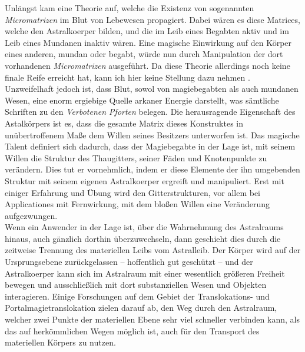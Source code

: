 \documentclass[a5paper,8pt]{book}
\begin{document}
\begin{multicols}{2}
Unlängst kam eine Theorie auf, welche die Existenz von sogenannten \textit{Micromatrizen} im Blut von Lebewesen
propagiert. Dabei wären es diese Matrices, welche den Astralkoerper bilden, und die im Leib eines Begabten aktiv und im
Leib eines Mundanen inaktiv wären. Eine magische Einwirkung auf den Körper eines anderen, mundan oder begabt, würde nun
durch Manipulation der dort vorhandenen \textit{Micromatrizen} ausgeführt. Da diese Theorie allerdings noch
keine finale Reife erreicht hat, kann ich hier keine Stellung dazu nehmen
\footnotemark[1]
.
Unzweifelhaft jedoch ist, dass Blut, sowol von magiebegabten als auch mundanen Wesen, eine enorm ergiebige
Quelle arkaner Energie darstellt, was sämtliche Schriften zu den \textit{Verbotenen Pforten}
\footnotemark[2]
belegen.
Die herausragende Eigenschaft des Astalkörpers ist es, dass die gesamte Matrix dieses Konstruktes in
unübertroffenem Maße dem Willen seines Besitzers unterworfen ist. Das magische Talent definiert sich
dadurch, dass der Magiebegabte in der Lage ist, mit seinem Willen die Struktur des Thaugitters, seiner Fäden und Knotenpunkte zu
verändern. Dies tut er vornehmlich, indem er diese Elemente der ihn umgebenden Struktur mit seinem eigenen
Astralkoerper ergreift und manipuliert. Erst mit einiger Erfahrung und Übung wird den Gitterstrukturen, vor
allem bei Applicationes mit Fernwirkung, mit dem bloßen Willen eine Veränderung aufgezwungen.\\

Wenn ein Anwender in der Lage ist, über die Wahrnehmung des Astralraums hinaus, auch gänzlich dorthin überzuwechseln,
dann geschieht dies durch die zeitweise Trennung des materiellen Leibs vom Astralleib. Der Körper wird auf der
Ursprungsebene zurückgelassen -- hoffentlich gut geschützt -- und der Astralkoerper kann sich im Astralraum mit einer
wesentlich größeren Freiheit bewegen und ausschließlich mit dort substanziellen Wesen und Objekten interagieren.
Einige Forschungen auf dem Gebiet der Translokations- und Portalmagietranslokation zielen darauf ab, den Weg
durch den Astralraum, welcher zwei Punkte der materiellen Ebene sehr viel schneller verbinden kann, als das auf
herkömmlichen Wegen möglich ist, auch für den Transport des materiellen Körpers zu nutzen.
\end{multicols}
\noindent\hrulefill
\end{document}
